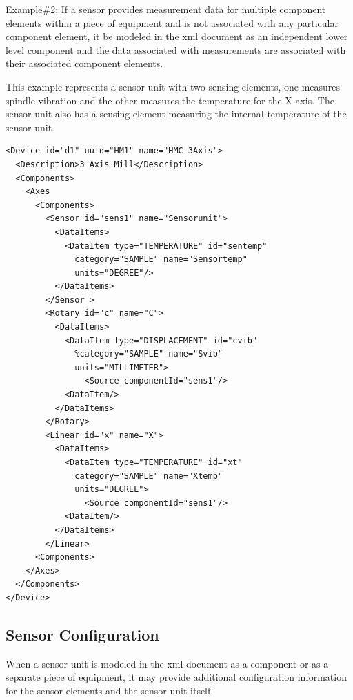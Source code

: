 Example\#2:   If a \gls{sensor} provides measurement data for multiple \gls{component} elements within a piece of equipment and is not associated with any particular \gls{component} element, it \may be modeled in the \gls{xml} document as an independent \gls{lower level} \gls{component} and the data associated with measurements are associated with their associated \gls{component} elements.

This example represents a \gls{sensor unit} with two \glspl{sensing element}, one measures spindle vibration and the other measures the temperature for the X axis.   The \gls{sensor unit} also has a \gls{sensing element} measuring the internal temperature of the \gls{sensor unit}.

\begin{lstlisting}[firstnumber=1,escapechar=|,%
    caption={Example of Sensor Unit with Sensing Element}, label={lst:example-of-sensor-with-sensing-elements}]
<Device id="d1" uuid="HM1" name="HMC_3Axis">
  <Description>3 Axis Mill</Description>
  <Components>
    <Axes
      <Components>
        <Sensor id="sens1" name="Sensorunit">
          <DataItems>
            <DataItem type="TEMPERATURE" id="sentemp"
              category="SAMPLE" name="Sensortemp" 
              units="DEGREE"/> 
          </DataItems>
        </Sensor >
        <Rotary id="c" name="C">
          <DataItems>
            <DataItem type="DISPLACEMENT" id="cvib"
              %category="SAMPLE" name="Svib" 
              units="MILLIMETER">
                <Source componentId="sens1"/>
            <DataItem/>
          </DataItems>
        </Rotary>
        <Linear id="x" name="X">
          <DataItems>
            <DataItem type="TEMPERATURE" id="xt" 
              category="SAMPLE" name="Xtemp" 
              units="DEGREE">
                <Source componentId="sens1"/>
            <DataItem/>
          </DataItems>
        </Linear>
      <Components>
    </Axes>
  </Components>
</Device>
\end{lstlisting}

\subsection{Sensor Configuration}
\label{sec:Sensor Configuration}

When a \gls{sensor} unit is modeled in the \gls{xml} document as a \gls{component} or as a separate piece of equipment, it may provide additional configuration information for the \glspl{sensor element} and the \gls{sensor unit} itself.  

